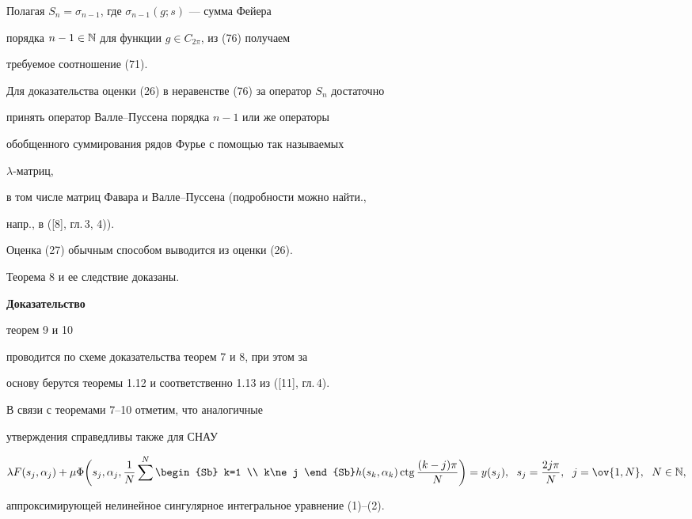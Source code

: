Полагая $S_n=\sigma_{n-1}$, где $\sigma_{n-1}(g;s)$ --- сумма Фейера


порядка $n-1\in \Bbb N$ для функции $g\in C_{2\pi}$, из (76) получаем


требуемое соотношение (71).





Для доказательства оценки (26) в неравенстве (76) за оператор $S_n$ достаточно


принять оператор Валле--Пуссена порядка $n-1$ или же операторы


обобщенного суммирования рядов Фурье с помощью так называемых


$\lambda$-матриц,


в том числе матриц Фавара и Валле--Пуссена (подробности можно найти.,


напр., в ([8], гл.\,3, 4)).


Оценка (27) обычным способом выводится из оценки (26).





Теорема 8 и ее следствие доказаны.


\medskip





{\bf Доказательство


теорем 9 и 10} проводится по схеме доказательства теорем 7 и 8, при этом за 


основу берутся теоремы 1.12 и соответственно 1.13 из ([11], гл.\,4).





В связи с теоремами 7--10 отметим, что аналогичные 


утверждения справедливы также для СНАУ


$$


\lambda F(s_j,\alpha_j)+\mu \Phi\bigg(s_j,\alpha_j,\frac{1}{N}


\sum^N \begin{Sb} k=1 \\ k\ne j \end{Sb}


h(s_k,\alpha_k) \ctg \frac{(k-j)\pi}{N}\bigg)=


y(s_j),\ \; s_j=\frac{2j\pi}{N},\ \; j=\ov{1,N},\ \; N\in \Bbb N,


$$


аппроксимирующей нелинейное сингулярное интегральное уравнение (1)--(2).


\medskip





